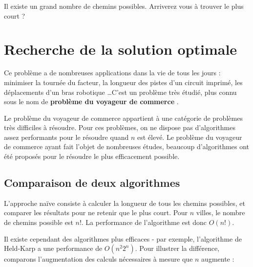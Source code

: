 \documentclass[a5paper,pagesize,DIV=14]{scrbook}
\begin{document}

Il existe un grand nombre de chemins possibles. Arriverez vous à trouver le plus court ?

\newpage

\section*{Recherche de la solution optimale}

Ce problème a de nombreuses applications dans la vie de tous les jours : minimiser la tournée du facteur, la longueur des pistes d'un circuit imprimé, les déplacements d'un bras robotique \ldots C'est un problème très étudié, plus connu sous le nom de \textbf{\og problème du voyageur de commerce \fg}.

Le problème du voyageur de commerce appartient à une catégorie de problèmes très difficiles à résoudre. Pour ces problèmes, on ne dispose pas d'algorithmes assez performants pour le résoudre quand $n$ est élevé. Le problème du voyageur de commerce ayant fait l'objet de nombreuses études, beaucoup d'algorithmes ont été proposés pour le résoudre le plus efficacement possible.

\subsection*{Comparaison de deux algorithmes}

L'approche naïve consiste à calculer la longueur de tous les chemins possibles, et comparer les résultats pour ne retenir que le plus court. Pour $n$ villes, le nombre de chemins possible est $n!$. La performance de l'algorithme est donc $O(n!)$.

Il existe cependant des algorithmes plus efficaces - par exemple, l'algorithme de Held-Karp a une performance de $O(n^{2}2^n)$. Pour illustrer la différence, comparons l'augmentation des calculs nécessaires à mesure que $n$ augmente :
\end{document}
